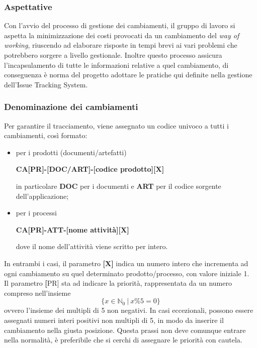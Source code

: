 \subsubsection{Aspettative}
Con l'avvio del processo di gestione dei cambiamenti, il gruppo di lavoro si aspetta la minimizzazione dei costi provocati da un cambiamento
del \textit{way of working}, riuscendo ad elaborare risposte in tempi brevi ai vari problemi che potrebbero sorgere a livello gestionale.
Inoltre questo processo assicura l'incapsulamento di tutte le informazioni relative a quel cambiamento, di conseguenza è norma del progetto adottare le
pratiche qui definite nella gestione dell'Issue Tracking System.

\subsubsection{Denominazione dei cambiamenti}
Per garantire il tracciamento, viene assegnato un codice univoco a tutti i cambiamenti, così formato:
\begin{itemize}
    \item per i prodotti (documenti/artefatti)
          \begin{center}
              \textbf{CA[PR]-[DOC/ART]-[codice prodotto][X]}
          \end{center}
          in particolare \textbf{DOC} per i documenti e \textbf{ART} per il codice sorgente dell'applicazione;
    \item per i processi
          \begin{center}
              \textbf{CA[PR]-ATT-[nome attività][X]}
          \end{center}
          dove il nome dell'attività viene scritto per intero.
\end{itemize}
In entrambi i casi, il parametro \textbf{[X]} indica un numero intero che incrementa ad ogni cambiamento su quel determinato prodotto/processo,
con valore iniziale 1.\\
Il parametro \textbf[PR] sta ad indicare la priorità, rappresentata da un numero compreso nell'insieme
\[\{x \in \mathbb{N}_0 \ | \  x \% 5 = 0 \} \]
ovvero l'insieme dei multipli di 5 non negativi. In casi eccezionali, possono essere assegnati numeri interi positivi non multipli di 5,
in modo da inserire il cambiamento nella giusta posizione. Questa prassi non deve comunque entrare nella normalità,  è preferibile che si cerchi
di assegnare le priorità con cautela.

